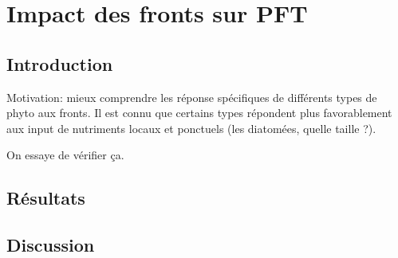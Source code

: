 
\chapter{Impact des fronts sur PFT}

\section{Introduction}

Motivation: mieux comprendre les réponse spécifiques de différents types de phyto aux fronts.
Il est connu que certains types répondent plus favorablement aux input de nutriments locaux et ponctuels (les diatomées, quelle taille ?).

On essaye de vérifier ça.

\section{Résultats}

\section{Discussion}
